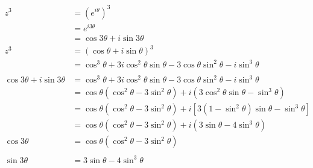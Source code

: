 \documentclass{article}
\begin{document}
\begin{enumerate}
        \begin{align*}
          z^3                             & = (e^{i \theta})^3                                                                                      \\
                                          & = e^{i 3 \theta}                                                                                        \\
                                          & = \cos 3 \theta + i \sin 3 \theta                                                                       \\
          z^3                             & = (\cos \theta + i \sin \theta)^3                                                                       \\
                                          & = \cos^3 \theta + 3 i \cos^2 \theta \sin \theta - 3 \cos \theta \sin^2 \theta - i \sin^3 \theta         \\ \\
          \cos 3 \theta + i \sin 3 \theta & = \cos^3 \theta + 3 i \cos^2 \theta \sin \theta - 3 \cos \theta \sin^2 \theta - i \sin^3 \theta         \\
                                          & = \cos \theta (\cos^2 \theta - 3 \sin^2 \theta) + i (3 \cos^2 \theta \sin \theta - \sin^3 \theta)       \\
                                          & = \cos \theta (\cos^2 \theta - 3 \sin^2 \theta) + i [3 (1 - \sin^2 \theta) \sin \theta - \sin^3 \theta] \\
                                          & = \cos \theta (\cos^2 \theta - 3 \sin^2 \theta) + i (3 \sin \theta - 4 \sin^3 \theta)                   \\
          \cos 3 \theta                   & = \cos \theta (\cos^2 \theta - 3 \sin^2 \theta)                                                         \\ \\
          \sin 3 \theta                   & = 3 \sin \theta - 4 \sin^3 \theta
        \end{align*}
\end{enumerate}

\setcounter{subsection}{52}
\subsection{}
\end{document}
